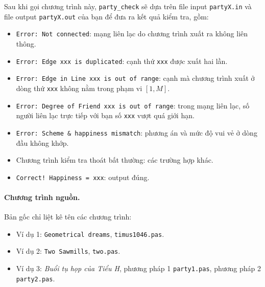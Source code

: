 \documentclass[11pt]{article}
\begin{document}
Sau khi gọi chương trình này, \texttt{party\_check} sẽ dựa trên file input
\texttt{partyX.in} và file output \texttt{partyX.out} của bạn để đưa ra kết
quả kiểm tra, gồm:
\begin{itemize}
  \item \texttt{Error: Not connected}: mạng liên lạc do chương trình xuất ra
  không liên thông.
  \item \texttt{Error: Edge xxx is duplicated}: cạnh thứ \texttt{xxx} được
  xuất hai lần.
  \item \texttt{Error: Edge in Line xxx is out of range}: cạnh mà chương trình
  xuất ở dòng thứ \texttt{xxx} không nằm trong phạm vi $[1,M]$.
  \item \texttt{Error: Degree of Friend xxx is out of range}: trong mạng liên
  lạc, số người liên lạc trực tiếp với bạn số \texttt{xxx} vượt quá giới hạn.
  \item \texttt{Error: Scheme \& happiness mismatch}: phương án và mức độ vui
  vẻ ở dòng đầu không khớp.
  \item Chương trình kiểm tra thoát bất thường: các trường hợp khác.
  \item \texttt{Correct! Happiness = xxx}: output đúng.
\end{itemize}

\paragraph{Chương trình nguồn.}
Bản gốc chỉ liệt kê tên các chương trình:
\begin{itemize}
  \item Ví dụ 1: \texttt{Geometrical dreams}, \texttt{timus1046.pas}.
  \item Ví dụ 2: \texttt{Two Sawmills}, \texttt{two.pas}.
  \item Ví dụ 3: \textit{Buổi tụ họp của Tiểu H}, phương pháp 1
  \texttt{party1.pas}, phương pháp 2 \texttt{party2.pas}.
\end{itemize}
\end{document}
